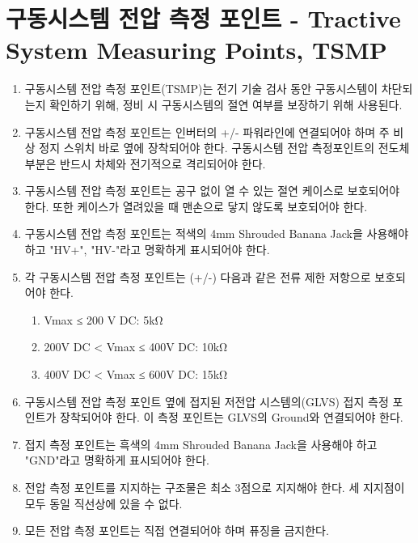 \documentclass[final,a4paper,10pt]{report}
\begin{document}
\section{구동시스템 전압 측정 포인트 - Tractive System Measuring Points, TSMP} \label{section:TSMP}
\begin{enumerate}
  \item 구동시스템 전압 측정 포인트(TSMP)는 전기 기술 검사 동안 구동시스템이 차단되는지 확인하기 위해, 정비 시 구동시스템의 절연 여부를 보장하기 위해 사용된다.
  \item 구동시스템 전압 측정 포인트는 인버터의 +/- 파워라인에 연결되어야 하며 주 비상 정지 스위치 바로 옆에 장착되어야 한다. 구동시스템 전압 측정포인트의 전도체 부분은 반드시 차체와 전기적으로 격리되어야 한다.
  \item 구동시스템 전압 측정 포인트는 공구 없이 열 수 있는 절연 케이스로 보호되어야 한다. 또한 케이스가 열려있을 때 맨손으로 닿지 않도록 보호되어야 한다.
  \item 구동시스템 전압 측정 포인트는 적색의 4mm Shrouded Banana Jack을 사용해야 하고 "HV+", "HV-"라고 명확하게 표시되어야 한다.
  
  \item 각 구동시스템 전압 측정 포인트는 (+/-) 다음과 같은 전류 제한 저항으로 보호되어야 한다. \label{item:TSMP 전류 제한 저항}
    \begin{enumerate}
      \item Vmax ≤ 200 V DC: 5kΩ
      \item 200V DC < Vmax ≤ 400V DC: 10kΩ
      \item 400V DC < Vmax ≤ 600V DC: 15kΩ
    \end{enumerate}

    
  \item 구동시스템 전압 측정 포인트 옆에 접지된 저전압 시스템의(GLVS) 접지 측정 포인트가 장착되어야 한다. 이 측정 포인트는 GLVS의 Ground와 연결되어야 한다.
  \item 접지 측정 포인트는 흑색의 4mm Shrouded Banana Jack을 사용해야 하고 "GND"라고 명확하게 표시되어야 한다.
  \item 전압 측정 포인트를 지지하는 구조물은 최소 3점으로 지지해야 한다. 세 지지점이 모두 동일 직선상에 있을 수 없다.
  \item 모든 전압 측정 포인트는 직접 연결되어야 하며 퓨징을 금지한다.
\end{enumerate}
\end{document}
